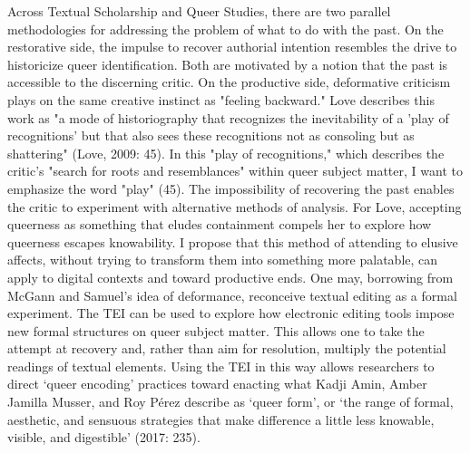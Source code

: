 \documentclass[11pt]{article}
\begin{document}
Across Textual Scholarship and Queer Studies, there are two parallel
methodologies for addressing the problem of what to do with the
past. On the restorative side, the impulse to recover authorial
intention resembles the drive to historicize queer
identification. Both are motivated by a notion that the past is
accessible to the discerning critic. On the productive side,
deformative criticism plays on the same creative instinct as "feeling
backward." Love describes this work as "a mode of historiography that
recognizes the inevitability of a 'play of recognitions' but that also
sees these recognitions not as consoling but as shattering" (Love,
2009: 45). In this "play of recognitions," which describes the
critic's "search for roots and resemblances" within queer subject
matter, I want to emphasize the word "play" (45). The impossibility of
recovering the past enables the critic to experiment with alternative
methods of analysis. For Love, accepting queerness as something that
eludes containment compels her to explore how queerness escapes
knowability. I propose that this method of attending to elusive
affects, without trying to transform them into something more
palatable, can apply to digital contexts and toward productive
ends. One may, borrowing from McGann and Samuel's idea of deformance,
reconceive textual editing as a formal experiment. The TEI can be used
to explore how electronic editing tools impose new formal structures
on queer subject matter. This allows one to take the attempt at
recovery and, rather than aim for resolution, multiply the potential
readings of textual elements. Using the TEI in this way allows
researchers to direct ‘queer encoding' practices toward enacting what
Kadji Amin, Amber Jamilla Musser, and Roy Pérez describe as ‘queer
form', or ‘the range of formal, aesthetic, and sensuous strategies
that make difference a little less knowable, visible, and digestible'
(2017: 235).
\end{document}
